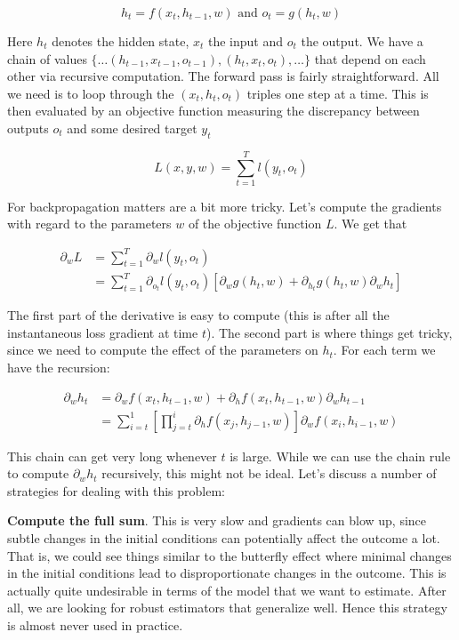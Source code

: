 $$h_t = f(x_t, h_{t-1}, w) \text{ and } o_t = g(h_t, w)$$

Here $h_t$ denotes the hidden state, $x_t$ the input and $o_t$ the output. We have a chain of values $\{\ldots (h_{t-1}, x_{t-1}, o_{t-1}), (h_{t}, x_{t}, o_t), \ldots\}$ that depend on each other via recursive computation. The forward pass is fairly straightforward. All we need is to loop through the $(x_t, h_t, o_t)$ triples one step at a time. This is then evaluated by an objective function measuring the discrepancy between outputs $o_t$ and some desired target $y_t$

$$L(x,y, w) = \sum_{t=1}^T l(y_t, o_t)$$

For backpropagation matters are a bit more tricky. Let’s compute the gradients with regard to the parameters $w$ of the objective function $L$. We get that

$$
\begin{aligned}
\partial_{w} L & = \sum_{t=1}^T \partial_w l(y_t, o_t) \\
    & = \sum_{t=1}^T \partial_{o_t} l(y_t, o_t) \left[\partial_w g(h_t, w) + \partial_{h_t} g(h_t,w) \partial_w h_t\right]
\end{aligned}
$$

The first part of the derivative is easy to compute (this is after all the instantaneous loss gradient at time $t$). The second part is where things get tricky, since we need to compute the effect of the parameters on $h_t$. For each term we have the recursion:

$$
\begin{aligned}
    \partial_w h_t & = \partial_w f(x_t, h_{t-1}, w) + \partial_h f(x_t, h_{t-1}, w) \partial_w h_{t-1} \\
    & = \sum_{i=t}^1 \left[\prod_{j=t}^i \partial_h f(x_j, h_{j-1}, w) \right] \partial_w f(x_{i}, h_{i-1}, w)
\end{aligned}
$$

This chain can get very long whenever $t$ is large. While we can use the chain rule to compute $\partial_w h_t$ recursively, this might not be ideal. Let’s discuss a number of strategies for dealing with this problem:

\textbf{Compute the full sum}. This is very slow and gradients can blow up, since subtle changes in the initial conditions can potentially affect the outcome a lot. That is, we could see things similar to the butterfly effect where minimal changes in the initial conditions lead to disproportionate changes in the outcome. This is actually quite undesirable in terms of the model that we want to estimate. After all, we are looking for robust estimators that generalize well. Hence this strategy is almost never used in practice.

